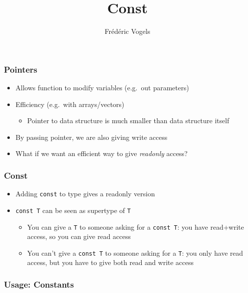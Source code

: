 \usepackage{ucll-code}
\usetikzlibrary{shadows,shapes.multipart}

\title{Const}
\author{Fr\'ed\'eric Vogels}





\begin{frame}
  \titlepage
\end{frame}

\begin{frame}
  \frametitle{Pointers}
  \begin{itemize}
    \item Allows function to modify variables (e.g.\ out parameters)
    \item Efficiency (e.g.\ with arrays/vectors)
          \begin{itemize}
            \item Pointer to data structure is much smaller than data structure itself
          \end{itemize}
  \end{itemize}
  \vskip5mm
  \begin{itemize}
    \item By passing pointer, we are also giving write access
    \item What if we want an efficient way to give \emph{readonly} access?
  \end{itemize}
\end{frame}

\begin{frame}
  \frametitle{Const}
  \begin{itemize}
    \item Adding {\tt const} to type gives a readonly version
    \item {\tt const T} can be seen as supertype of {\tt T}
      \begin{itemize}
        \item You can give a {\tt T} to someone asking for a {\tt const T}:
              you have read+write access, so you can give read access
        \item You can't give a {\tt const T} to someone asking for a {\tt T}:
              you only have read access, but you have to give both read and write access
      \end{itemize}
  \end{itemize}
\end{frame}

\begin{frame}
  \frametitle{Usage: Constants}
\end{frame}

